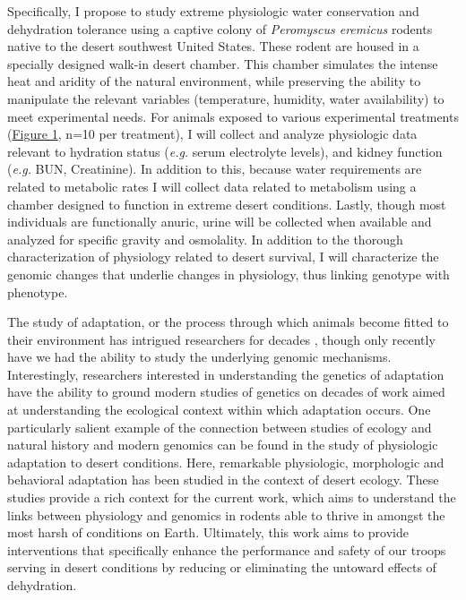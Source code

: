 \documentclass[12pt]{article}
\begin{document}
Specifically, I propose to study extreme physiologic water conservation and dehydration tolerance using a captive colony of \textit{Peromyscus eremicus} rodents native to the desert southwest United States. These rodent are housed in a specially designed walk-in desert chamber. This chamber simulates the intense heat and aridity of the natural environment, while preserving the ability to manipulate the relevant variables (temperature, humidity, water availability) to meet experimental needs. For animals exposed to various experimental treatments (\hyperlink{Figure 1}{Figure 1}, n=10 per treatment), I will collect and analyze physiologic data relevant to hydration status (\textit{e.g.} serum electrolyte levels), and kidney function (\textit{e.g.} BUN, Creatinine). In addition to this, because water requirements are related to metabolic rates I will collect data related to metabolism using a chamber designed to function in extreme desert conditions. Lastly, though most individuals are functionally anuric, urine will be collected when available and analyzed for specific gravity and osmolality. In addition to the thorough characterization of physiology related to desert survival, I will characterize the genomic changes that underlie changes in physiology, thus linking genotype with phenotype. 

The study of adaptation, or the process through which animals become fitted to their environment has intrigued researchers for decades \citep{Darwin:1859tm, Fisher:1930wy}, though only recently have we had the ability to study the underlying genomic mechanisms. Interestingly, researchers interested in understanding the genetics of adaptation have the ability to ground modern studies of genetics on decades of work aimed at understanding the ecological context within which adaptation occurs. One particularly salient example of the connection between studies of ecology and natural history and modern genomics can be found in the study of physiologic adaptation to desert conditions. Here, remarkable physiologic, morphologic \citep{Dickinson:2007jn,Huntley:1984us,SchmidtNielsen:1950wg,SchmidtNielsen:1952wp} and behavioral \citep{NAGY:1994vd} adaptation has been studied in the context of desert ecology. These studies provide a rich context for the current work, which aims to understand the links between physiology and genomics in rodents able to thrive in amongst the most harsh of conditions on Earth. Ultimately, this work aims to provide interventions that specifically enhance the performance and safety of our troops serving in desert conditions by reducing or eliminating the untoward effects of dehydration.
\end{document}
